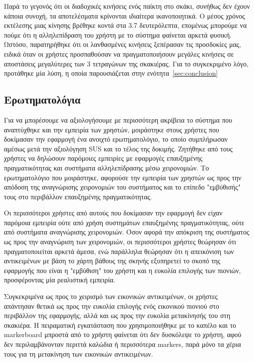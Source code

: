 Παρά το γεγονός ότι οι διαδοχικές κινήσεις ενός παίκτη στο σκάκι, συνήθως δεν έχουν κάποια συνοχή, τα αποτελέσματα κρίνονται ιδιαίτερα ικανοποιητικά. Ο μέσος χρόνος εκτέλεσης μιας κίνησης βρέθηκε κοντά στα 3.7 δευτερόλεπτα, επομένως μπορούμε να πούμε ότι η αλληλεπίδραση του χρήστη με το σύστημα φαίνεται αρκετά φυσική. Ωστόσο, παρατηρήθηκε ότι οι λανθασμένες κινήσεις ξεπέρασαν τις προσδοκίες μας, ειδικά όταν οι χρήστες προσπαθούσαν να πραγματοποιήσουν μεγάλες κινήσεις σε αποστάσεις μεγαλύτερες των 3 τετραγώνων της σκακιέρας. Για το συγκεκριμένο λόγο, προτάθηκε μία λύση, η οποία παρουσιάζεται στην ενότητα~\ref{sec:conclusion}


\subsection{Ερωτηματολόγια}

Για να μπορέσουμε να αξιολογήσουμε με περισσότερη ακρίβεια το σύστημα που αναπτύχθηκε και την εμπειρία των χρηστών, μοιράστηκε στους χρήστες που δοκίμασαν την εφαρμογή ένα ανοιχτό ερωτηματολόγιο, το οποίο συμπλήρωσαν αμέσως μετά την αξιολόγηση SUS και το τέλος της δοκιμής. Ζητήθηκε από τους χρήστες να δηλώσουν παρόμοιες εμπειρίες με εφαρμογές επαυξημένης πραγματικότητας και συστήματα αλληλεπίδρασης μέσω χειρονομιών. Το ερωτηματολόγιο που μοιράστηκε, αφορούσε την εμπειρία των χρηστών ως προς την απόδοση της αναγνώρισης χειρονομιών του συστήματος και το επίπεδο "εμβύθισής" τους στο περιβάλλον επαυξημένης πραγματικότητας. 


Οι περισσότεροι χρήστες από αυτούς που δοκίμασαν την εφαρμογή δεν είχαν παρόμοια εμπειρία ούτε από χρήση συστημάτων επαυξημένης πραγματικότητας, ούτε από συστήματα αναγνώρισης χειρονομιών.
Όσον αφορά την απόκριση της συστήματος ως προς την αναγνώριση των χειρονομιών, οι περισσότεροι χρήστες θεώρησαν ότι πραγματοποιείται αρκετά άμεσα, ενώ παράλληλα θεώρησαν ότι η απεικόνιση των αντικειμένων με βάση το χάρτη βάθους της σκηνής εξυπηρετεί το σκοπό της εφαρμογής που είναι η "εμβύθιση" του χρήστη και η ευκολία επιλογής των πιονιών, προσφέροντας μία ρεαλιστική εμπειρία.

Συγκεκριμένα ως προς το χειρισμό των εικονικών αντικειμένων, οι χρήστες απάντησαν θετικά ως προς την ευκολία επιλογής ενός εικονικού πιονιού στο περιβάλλον της εφαρμογής, αλλά και ως προς την ευκολία μετακίνησής του στη σκακιέρα. Η πειραματική εγκατάσταση που χρησιμοποιήθηκε με το καπέλο και το markerboard μπροστά από το χρήστη φαίνεται ότι δεν δυσκόλεψε το χρήστη, αφού δεν περιλαμβάνονταν περιττά καλώδια ή περισσότερα markers, παρά μόνο τα χέρια τους για τη μετακίνηση των εικονικών αντικειμένων.


